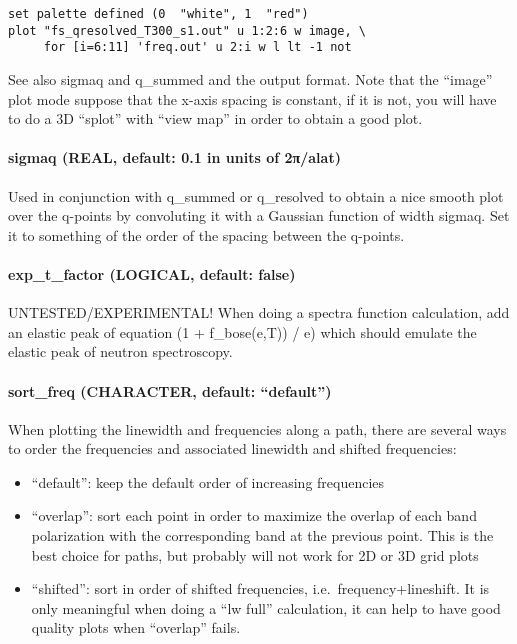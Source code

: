 \documentclass[
]{article}
\providecommand{\tightlist}{%
  \setlength{\itemsep}{0pt}\setlength{\parskip}{0pt}}
\begin{document}
\begin{verbatim}
set palette defined (0  "white", 1  "red") 
plot "fs_qresolved_T300_s1.out" u 1:2:6 w image, \
     for [i=6:11] 'freq.out' u 2:i w l lt -1 not
\end{verbatim}

See also sigmaq and q\_summed and the output format. Note that the
\enquote{image} plot mode suppose that the x-axis spacing is constant,
if it is not, you will have to do a 3D \enquote{splot} with
\enquote{view map} in order to obtain a good plot.

\hypertarget{sigmaq-real-default-0.1-in-units-of-2ux3c0alat}{%
\paragraph{sigmaq (REAL, default: 0.1 in units of
2π/alat)}\label{sigmaq-real-default-0.1-in-units-of-2ux3c0alat}}

Used in conjunction with q\_summed or q\_resolved to obtain a nice
smooth plot over the q-points by convoluting it with a Gaussian function
of width sigmaq. Set it to something of the order of the spacing between
the q-points.

\hypertarget{exp_t_factor-logical-default-false}{%
\paragraph{exp\_t\_factor (LOGICAL, default:
false)}\label{exp_t_factor-logical-default-false}}

UNTESTED/EXPERIMENTAL! When doing a spectra function calculation, add an
elastic peak of equation (1 + f\_bose(e,T)) / e) which should emulate
the elastic peak of neutron spectroscopy.

\hypertarget{sort_freq-character-default-default-1}{%
\paragraph{\texorpdfstring{sort\_freq (CHARACTER, default:
\enquote{default})}{sort\_freq (CHARACTER, default: ``default'')}}\label{sort_freq-character-default-default-1}}

When plotting the linewidth and frequencies along a path, there are
several ways to order the frequencies and associated linewidth and
shifted frequencies:

\begin{itemize}
\tightlist
\item
  \enquote{default}: keep the default order of increasing frequencies
\item
  \enquote{overlap}: sort each point in order to maximize the overlap of
  each band polarization with the corresponding band at the previous
  point. This is the best choice for paths, but probably will not work
  for 2D or 3D grid plots
\item
  \enquote{shifted}: sort in order of shifted frequencies,
  i.e.~frequency+lineshift. It is only meaningful when doing a
  \enquote{lw full} calculation, it can help to have good quality plots
  when \enquote{overlap} fails.
\end{itemize}
\end{document}

